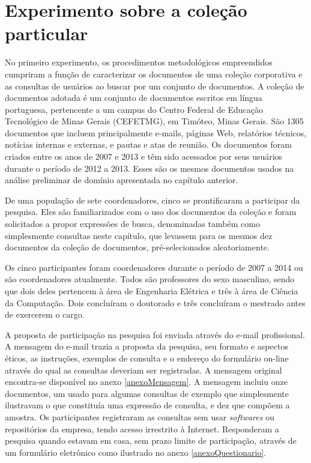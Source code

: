 \section{Experimento sobre a coleção particular}
\label{prototipo-colecaoParticular}


No primeiro experimento, os procedimentos metodológicos empreendidos cumpriram a função de caracterizar os documentos de uma coleção corporativa e as consultas de usuários ao buscar por um conjunto de documentos. A coleção de documentos adotada é um conjunto de documentos escritos em língua portuguesa, pertencente a um campus do Centro Federal de Educação Tecnológico de Minas Gerais (CEFETMG), em Timóteo, Minas Gerais. São 1305 documentos que incluem principalmente e-mails, páginas Web, relatórios técnicos, notícias internas e externas, e pautas e atas de reunião. Os documentos foram criados entre os anos de 2007 e 2013 e têm sido acessados por seus usuários durante o período de 2012 a 2013. Esses são os mesmos documentos usados na análise preliminar de domínio apresentada no capítulo anterior.

De uma população de sete coordenadores, cinco se prontificaram a participar da pesquisa. Eles são familiarizados com o uso dos documentos da coleção e foram solicitados a propor expressões de busca, denominadas também como simplesmente consultas neste capítulo, que levassem para os mesmos dez documentos da coleção de documentos, pré-selecionados aleatoriamente.

Os cinco participantes foram coordenadores durante o período de 2007 a 2014 ou são coordenadores atualmente. Todos são professores do sexo masculino, sendo que dois deles pertencem à área de Engenharia Elétrica e três à área de Ciência da Computação. Dois concluíram o doutorado e três concluíram o mestrado antes de exercerem o cargo.

A proposta de participação na pesquisa foi enviada através do e-mail profissional. A mensagem do e-mail trazia a proposta da pesquisa, seu formato e aspectos éticos, as instruções, exemplos de consulta e o endereço do formulário on-line através do qual as consultas deveriam ser registradas. A mensagem original encontra-se disponível no anexo \ref{anexoMensagem}. A mensagem incluiu onze documentos, um usado para algumas consultas de exemplo que simplesmente ilustravam o que constituía uma expressão de consulta, e dez que compõem a amostra. Os participantes registraram as consultas sem usar \textit{softwares} ou repositórios da empresa, tendo acesso irrestrito à Internet. Responderam a pesquisa quando estavam em casa, sem prazo limite de participação, através de um formulário eletrônico como ilustrado no anexo \ref{anexoQuestionario}.

